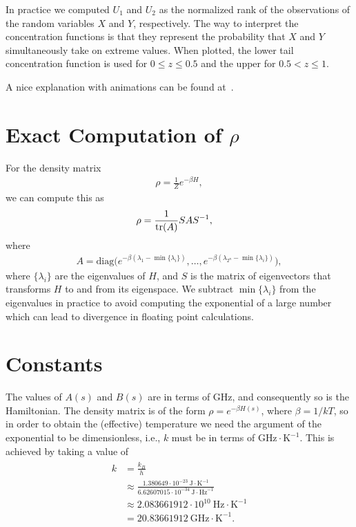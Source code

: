 In practice we computed \( U_1 \) and \( U_2 \) as the normalized rank of the observations of the random variables \( X \) and \( Y \), respectively.
The way to interpret the concentration functions is that they represent the probability that \( X \) and \( Y \) simultaneously take on extreme values.
When plotted, the lower tail concentration function is used for \( 0 \le z \le 0.5 \) and the upper for \( 0.5 < z \le 1 \).

A nice explanation with animations can be found at~\cite{charpentier_2012}.

\section{Exact Computation of \( \rho \)}\label{app:exact_rho_computation}
For the density matrix
\begin{align}
    \rho = \frac{1}{Z} e^{-\beta H},
\end{align}
we can compute this as
\begin{align}
    \rho
        &= \frac{1}{\text{tr}(A)} S A S^{-1},
\end{align}
where
\begin{align}
    A = \text{diag}\Big(e^{-\beta(\lambda_1 - \min\{\lambda_i\})}, \dots, e^{-\beta(\lambda_{2^n} - \min\{\lambda_i\})}\Big),
\end{align}
where \( \{\lambda_i\} \) are the eigenvalues of \( H \), and \( S \) is the matrix of eigenvectors that transforms \( H \) to and from its eigenspace.
We subtract \( \min\{\lambda_i\} \) from the eigenvalues in practice to avoid computing the exponential of a large number which can lead to divergence in floating point calculations.

\section{Constants}\label{app:constants}
The values of \( A(s) \) and \( B(s) \) are in terms of \si{\giga\hertz}, and consequently so is the Hamiltonian.
The density matrix is of the form \( \rho = e^{-\beta H(s)} \), where \( \beta = 1 / kT \), so in order to obtain the (effective) temperature we need the argument of the exponential to be dimensionless, i.e., \( k \) must be in terms of \( \si{\giga\hertz} \cdot \si{\kelvin}^{-1} \).
This is achieved by taking a value of
\begin{align}
\begin{split}
    k
        &= \frac{k_B}{h} \\
        &\approx \frac{1.380649 \cdot 10^{-23} \ \si{\joule} \cdot \si{\kelvin}^{-1}}{6.62607015 \cdot 10^{-34} \ \si{\joule} \cdot \si{\hertz}^{-1}} \\
        &\approx 2.083661912 \cdot 10^{10} \ \si{\hertz} \cdot \si{\kelvin}^{-1} \\
        &= 20.83661912 \ \si{\giga\hertz} \cdot \si{\kelvin}^{-1}.
\end{split}
\end{align}

